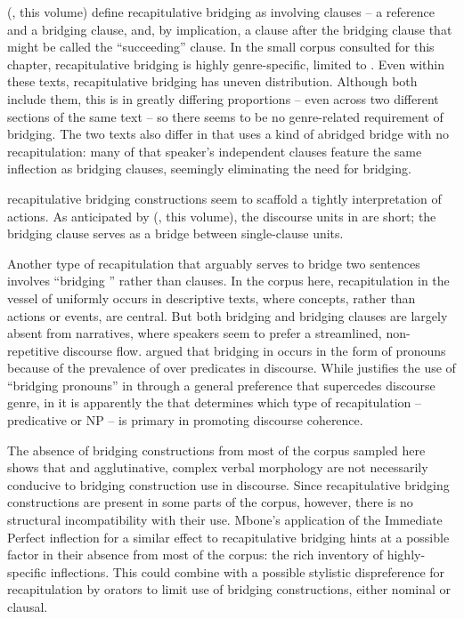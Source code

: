 \documentclass[output=paper]{LSP/langsci}
\begin{document}
\citeauthor{guerin18} (, this volume) define recapitulative bridging as involving clauses -- a reference and a bridging clause, and, by implication, a clause after the bridging clause that might be called the ``succeeding'' clause. In the small corpus consulted for this chapter,  recapitulative bridging is highly genre-specific, limited to . Even within these texts, recapitulative bridging has uneven distribution. Although both  include them, this is in greatly differing proportions -- even across two different sections of the same text -- so there seems to be no genre-related requirement of bridging. The two texts also differ in that \citet{Mbone2014} uses a kind of abridged bridge with no recapitulation: many of that speaker’s independent clauses feature the same inflection as bridging clauses, seemingly eliminating the need for bridging.

 recapitulative bridging constructions seem to scaffold a tightly  interpretation of actions. As anticipated by \citeauthor{guerin18} (, this volume), the discourse units in   are short; the bridging clause serves as a bridge between single-clause units. 

Another type of recapitulation that arguably serves to bridge two sentences involves ``bridging '' rather than clauses. In the  corpus here, recapitulation in the vessel of  uniformly occurs in descriptive texts, where concepts, rather than actions or events, are central. But both bridging  and bridging clauses are largely absent from narratives, where  speakers seem to prefer a streamlined, non-repetitive discourse flow. \citet{seifart10} argued that bridging in  occurs in the form of pronouns because of the prevalence of  over predicates in  discourse. While \citet{seifart10} justifies the use of ``bridging pronouns'' in  through a general preference that supercedes discourse genre, in  it is apparently the  that determines which type of recapitulation -- predicative or NP -- is primary in promoting discourse coherence.

The absence of bridging constructions from most of the  corpus sampled here shows that  and agglutinative, complex verbal morphology are not necessarily conducive to bridging construction use in discourse. Since recapitulative bridging constructions are present in some parts of the corpus, however, there is no structural incompatibility with their use. Mbone’s application of the Immediate Perfect inflection for a similar effect to recapitulative bridging hints at a possible factor in their absence from most of the corpus: the rich  inventory of highly-specific  inflections. This could combine with a possible stylistic dispreference for recapitulation by  orators to limit use of bridging constructions, either nominal or clausal.
\end{document}
